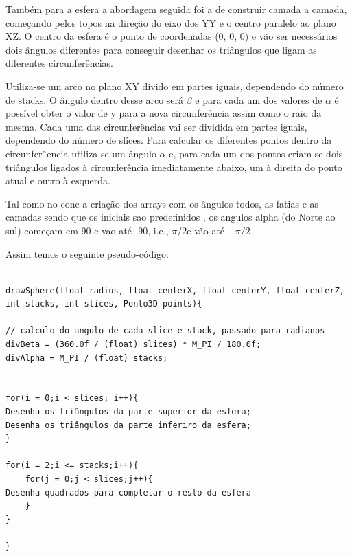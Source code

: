 Também para a esfera a abordagem seguida foi a de construir camada a camada, começando pelos topos na direção do eixo dos YY e o centro paralelo ao plano XZ. 
O centro da esfera é o ponto de coordenadas (0, 0, 0) e vão ser necessários dois ângulos diferentes para conseguir desenhar os triângulos que ligam as diferentes circunferências.

Utiliza-se um arco no plano XY divido em partes iguais, dependendo do
número de stacks. O ângulo dentro desse arco será $\beta$ e para cada um dos
valores de $\alpha$ é possível obter o valor de y para a nova circunferência assim
como o raio da mesma.
Cada uma das circunferências vai ser dividida em partes iguais, dependendo
do número de slices. Para calcular os diferentes pontos dentro da
circunferˆencia utiliza-se um ângulo  $\alpha$ e, para cada um dos pontos criam-se
dois triângulos ligados à circunferência imediatamente abaixo, um à direita
do ponto atual e outro à esquerda. 


Tal como no cone a criação dos arrays com os ângulos todos, as fatias  e as camadas sendo que os iniciais sao predefinidos
, os angulos alpha (do Norte ao sul) começam em 90 e vao até -90, i.e., $\pi /2 $e vão até $-\pi /2 $
 

Assim temos o seguinte pseudo-código:

\begin{Verbatim}

drawSphere(float radius, float centerX, float centerY, float centerZ, int stacks, int slices, Ponto3D points){

// calculo do angulo de cada slice e stack, passado para radianos
divBeta = (360.0f / (float) slices) * M_PI / 180.0f;
divAlpha = M_PI / (float) stacks;  


for(i = 0;i < slices; i++){
Desenha os triângulos da parte superior da esfera;
Desenha os triângulos da parte inferiro da esfera;
}

for(i = 2;i <= stacks;i++){
	for(j = 0;j < slices;j++){
Desenha quadrados para completar o resto da esfera
	}
}

}

\end{Verbatim}

